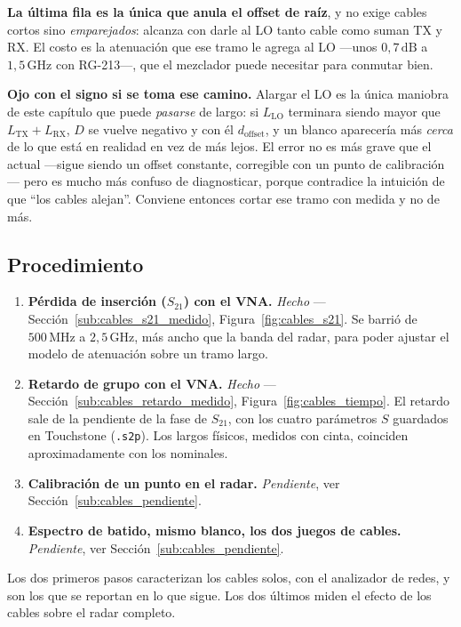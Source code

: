 \documentclass[12pt, a4paper, twoside]{report}
\begin{document}
\textbf{La última fila es la única que anula el offset de raíz}, y no
exige cables cortos sino \emph{emparejados}: alcanza con darle al LO
tanto cable como suman TX y RX. El costo es la atenuación que ese tramo
le agrega al LO ---unos $0{,}7\,\text{dB}$ a $1{,}5\,\text{GHz}$ con
RG-213---, que el mezclador puede necesitar para conmutar bien.

\textbf{Ojo con el signo si se toma ese camino.} Alargar el LO es la
única maniobra de este capítulo que puede \emph{pasarse} de largo: si
$L_\text{LO}$ terminara siendo mayor que $L_\text{TX} + L_\text{RX}$,
$D$ se vuelve negativo y con él $d_\text{offset}$, y un blanco
aparecería más \emph{cerca} de lo que está en realidad en vez de más
lejos. El error no es más grave que el actual ---sigue siendo un
offset constante, corregible con un punto de calibración--- pero es
mucho más confuso de diagnosticar, porque contradice la intuición de
que ``los cables alejan''. Conviene entonces cortar ese tramo con
medida y no de más.

\subsection{Procedimiento}
\label{sub:cables_procedimiento}

\begin{enumerate}
  \item \textbf{Pérdida de inserción ($S_{21}$) con el VNA.}
    \emph{Hecho} --- Sección~\ref{sub:cables_s21_medido},
    Figura~\ref{fig:cables_s21}. Se barrió de $500\,\text{MHz}$ a
    $2{,}5\,\text{GHz}$, más ancho que la banda del radar, para poder
    ajustar el modelo de atenuación sobre un tramo largo.
  \item \textbf{Retardo de grupo con el VNA.} \emph{Hecho} ---
    Sección~\ref{sub:cables_retardo_medido},
    Figura~\ref{fig:cables_tiempo}. El retardo sale de la pendiente de
    la fase de $S_{21}$, con los cuatro parámetros $S$ guardados en
    Touchstone (\texttt{.s2p}). Los largos físicos, medidos con cinta,
    coinciden aproximadamente con los nominales.
  \item \textbf{Calibración de un punto en el radar.} \emph{Pendiente},
    ver Sección~\ref{sub:cables_pendiente}.
  \item \textbf{Espectro de batido, mismo blanco, los dos juegos de
    cables.} \emph{Pendiente}, ver Sección~\ref{sub:cables_pendiente}.
\end{enumerate}

Los dos primeros pasos caracterizan los cables solos, con el analizador
de redes, y son los que se reportan en lo que sigue. Los dos últimos
miden el efecto de los cables sobre el radar completo.
\end{document}
